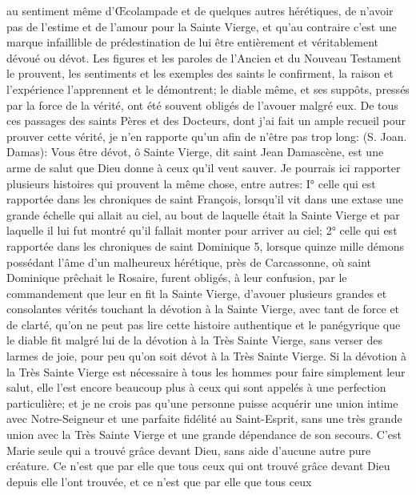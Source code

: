 au sentiment même d'Œcolampade et de quelques autres hérétiques, de n'avoir pas de l'estime et de l'amour pour
la Sainte Vierge, et qu'au contraire c'est une marque infaillible de prédestination de lui être entièrement et
véritablement dévoué ou dévot.
 Les figures et les paroles de l'Ancien et du Nouveau Testament le prouvent, les sentiments et les exemples
des saints le confirment, la raison et l'expérience l'apprennent et le démontrent; le diable même, et ses suppôts,
pressés par la force de la vérité, ont été souvent obligés de l'avouer malgré eux. De tous ces passages des saints
Pères et des Docteurs, dont j'ai fait un ample recueil pour prouver cette vérité, je n'en rapporte qu'un afin de n'être
pas trop long:  (S. Joan.
Damas): Vous être dévot, ô Sainte Vierge, dit saint Jean Damascène, est une arme de salut que Dieu donne à
ceux qu'il veut sauver.
 Je pourrais ici rapporter plusieurs histoires qui prouvent la même chose, entre autres: I° celle qui est rapportée
dans les chroniques de saint François, lorsqu'il vit dans une extase une grande échelle qui allait au ciel, au bout de
laquelle était la Sainte Vierge et par laquelle il lui fut montré qu'il fallait monter pour arriver au ciel; 2° celle qui est
rapportée dans les chroniques de saint Dominique 5, lorsque quinze mille démons possédant l'âme d'un
malheureux hérétique, près de Carcassonne, où saint Dominique prêchait le Rosaire, furent obligés, à leur
confusion, par le commandement que leur en fit la Sainte Vierge, d'avouer plusieurs grandes et consolantes
vérités touchant la dévotion à la Sainte Vierge, avec tant de force et de clarté, qu'on ne peut pas lire cette histoire
authentique et le panégyrique que le diable fit malgré lui de la dévotion à la Très Sainte Vierge, sans verser des
larmes de joie, pour peu qu'on soit dévot à la Très Sainte Vierge.
 Si la dévotion à la Très Sainte Vierge est nécessaire à tous les hommes pour faire simplement leur salut, elle
l'est encore beaucoup plus à ceux qui sont appelés à une perfection particulière; et je ne crois pas qu'une
personne puisse acquérir une union intime avec Notre-Seigneur et une parfaite fidélité au Saint-Esprit, sans une
très grande union avec la Très Sainte Vierge et une grande dépendance de son secours.
 C'est Marie seule qui a trouvé grâce devant Dieu, sans aide d'aucune autre pure créature. Ce n'est que par
elle que tous ceux qui ont trouvé grâce devant Dieu depuis elle l'ont trouvée, et ce n'est que par elle que tous ceux
